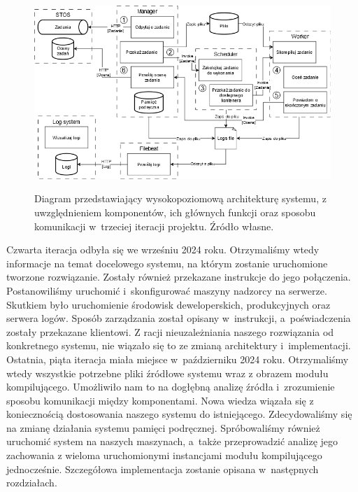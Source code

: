 \begin{figure}[!h]
	\begin{center}
		\resizebox{1.0\textwidth}{!} {
			\includegraphics{img/1/i3_arch.png}
		}
		\caption[Architektura po trzeciej iteracji]{Diagram przedstawiający wysokopoziomową architekturę systemu, z uwzględnieniem komponentów, ich głównych funkcji oraz sposobu komunikacji w~trzeciej iteracji projektu. Źródło własne.}
		\label{i3}
	\end{center}
\end{figure}
\newline \indent Czwarta iteracja odbyła się we wrześniu 2024 roku. Otrzymaliśmy wtedy informacje na temat docelowego systemu, na którym zostanie uruchomione tworzone rozwiązanie. Zostały również przekazane instrukcje do jego połączenia. Postanowiliśmy uruchomić i~skonfigurować maszyny nadzorcy na serwerze. Skutkiem było uruchomienie środowisk deweloperskich, produkcyjnych oraz serwera logów. Sposób zarządzania został opisany w~instrukcji, a~poświadczenia zostały przekazane klientowi. Z racji nieuzależniania naszego rozwiązania od konkretnego systemu, nie wiązało się to ze zmianą architektury i~implementacji. 
\newline \indent Ostatnia, piąta iteracja miała miejsce w~październiku 2024 roku. Otrzymaliśmy wtedy wszystkie potrzebne pliki źródłowe systemu wraz z obrazem modułu kompilującego. Umożliwiło nam to na dogłębną analizę źródła i~zrozumienie sposobu komunikacji między komponentami. Nowa wiedza wiązała się z koniecznością dostosowania naszego systemu do istniejącego. Zdecydowaliśmy się na zmianę działania systemu pamięci podręcznej. Spróbowaliśmy również uruchomić system na naszych maszynach, a~także przeprowadzić analizę jego zachowania z wieloma uruchomionymi instancjami modułu kompilującego jednocześnie. Szczegółowa implementacja zostanie opisana w~następnych rozdziałach.